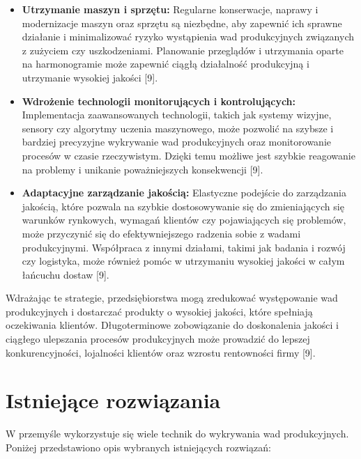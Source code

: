 \begin{itemize}
\item \textbf{Utrzymanie maszyn i sprzętu:} Regularne konserwacje, naprawy i modernizacje maszyn oraz sprzętu są niezbędne, aby zapewnić ich sprawne działanie i minimalizować ryzyko wystąpienia wad produkcyjnych związanych z zużyciem czy uszkodzeniami. Planowanie przeglądów i utrzymania oparte na harmonogramie może zapewnić ciągłą działalność produkcyjną i utrzymanie wysokiej jakości [9].

\item \textbf{Wdrożenie technologii monitorujących i kontrolujących:} Implementacja zaawansowanych technologii, takich jak systemy wizyjne, sensory czy algorytmy uczenia maszynowego, może pozwolić na szybsze i bardziej precyzyjne wykrywanie wad produkcyjnych oraz monitorowanie procesów w czasie rzeczywistym. Dzięki temu możliwe jest szybkie reagowanie na problemy i unikanie poważniejszych konsekwencji [9].

\item \textbf{Adaptacyjne zarządzanie jakością:} Elastyczne podejście do zarządzania jakością, które pozwala na szybkie dostosowywanie się do zmieniających się warunków rynkowych, wymagań klientów czy pojawiających się problemów, może przyczynić się do efektywniejszego radzenia sobie z wadami produkcyjnymi. Współpraca z innymi działami, takimi jak badania i rozwój czy logistyka, może również pomóc w utrzymaniu wysokiej jakości w całym łańcuchu dostaw [9].

\end{itemize}

Wdrażając te strategie, przedsiębiorstwa mogą zredukować występowanie wad produkcyjnych i dostarczać produkty o wysokiej jakości, które spełniają oczekiwania klientów. Długoterminowe zobowiązanie do doskonalenia jakości i ciągłego ulepszania procesów produkcyjnych może prowadzić do lepszej konkurencyjności, lojalności klientów oraz wzrostu rentowności firmy [9].

\section{Istniejące rozwiązania}
W przemyśle wykorzystuje się wiele technik do wykrywania wad produkcyjnych. Poniżej przedstawiono opis wybranych istniejących rozwiązań:

